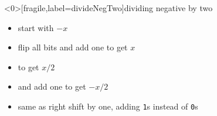 \begin{frame}<0>[fragile,label=divideNegTwo]{dividing negative by two}
    \begin{itemize}
    \item start with $-x$ 
    \item flip all bits and add one to get $x$
    \item {} to get $x/2$
    \item {} and add one to get $-x/2$
        \vspace{.5cm}
    \item<2-> same as right shift by one, adding {\tt 1}s instead of {\tt 0}s \\
    \end{itemize}
\end{frame}
